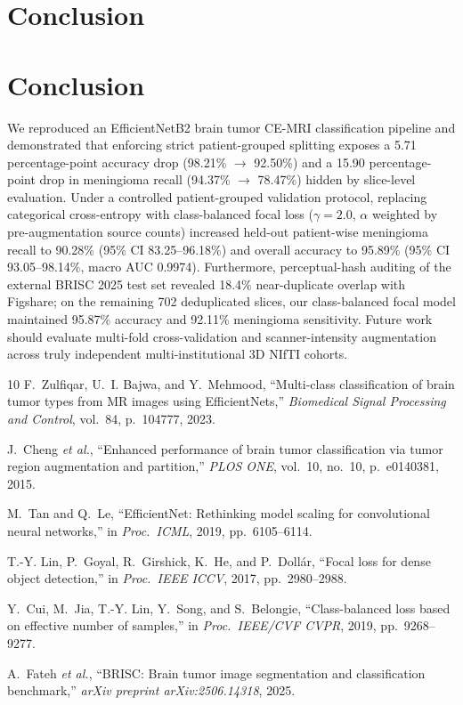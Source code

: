 \documentclass[conference]{IEEEtran}
\begin{document}
\section{Conclusion}
\section{Conclusion}
We reproduced an EfficientNetB2 brain tumor CE-MRI classification pipeline and demonstrated that enforcing strict patient-grouped splitting exposes a 5.71 percentage-point accuracy drop (98.21\% $\to$ 92.50\%) and a 15.90 percentage-point drop in meningioma recall (94.37\% $\to$ 78.47\%) hidden by slice-level evaluation. Under a controlled patient-grouped validation protocol, replacing categorical cross-entropy with class-balanced focal loss ($\gamma=2.0$, $\alpha$ weighted by pre-augmentation source counts) increased held-out patient-wise meningioma recall to 90.28\% (95\% CI 83.25--96.18\%) and overall accuracy to 95.89\% (95\% CI 93.05--98.14\%, macro AUC 0.9974). Furthermore, perceptual-hash auditing of the external BRISC 2025 test set revealed 18.4\% near-duplicate overlap with Figshare; on the remaining 702 deduplicated slices, our class-balanced focal model maintained 95.87\% accuracy and 92.11\% meningioma sensitivity. Future work should evaluate multi-fold cross-validation and scanner-intensity augmentation across truly independent multi-institutional 3D NIfTI cohorts.

\begin{thebibliography}{10}
F.~Zulfiqar, U.~I. Bajwa, and Y.~Mehmood, ``Multi-class classification of brain tumor types from MR images using EfficientNets,'' \emph{Biomedical Signal Processing and Control}, vol.~84, p.~104777, 2023.

J.~Cheng \emph{et al.}, ``Enhanced performance of brain tumor classification via tumor region augmentation and partition,'' \emph{PLOS ONE}, vol.~10, no.~10, p.~e0140381, 2015.

M.~Tan and Q.~Le, ``EfficientNet: Rethinking model scaling for convolutional neural networks,'' in \emph{Proc.\ ICML}, 2019, pp.~6105--6114.

T.-Y. Lin, P.~Goyal, R.~Girshick, K.~He, and P.~Doll{\'a}r, ``Focal loss for dense object detection,'' in \emph{Proc.\ IEEE ICCV}, 2017, pp.~2980--2988.

Y.~Cui, M.~Jia, T.-Y. Lin, Y.~Song, and S.~Belongie, ``Class-balanced loss based on effective number of samples,'' in \emph{Proc.\ IEEE/CVF CVPR}, 2019, pp.~9268--9277.

A.~Fateh \emph{et al.}, ``BRISC: Brain tumor image segmentation and classification benchmark,'' \emph{arXiv preprint arXiv:2506.14318}, 2025.
\end{thebibliography}
\end{document}

